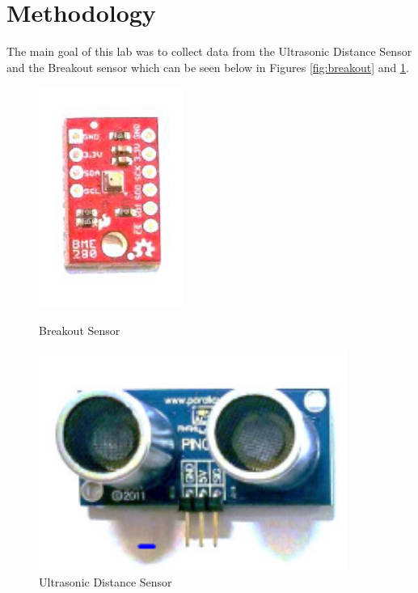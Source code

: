 \documentclass[11pt]{article}
\begin{document}
\section{Methodology}

The main goal of this lab was to collect data from the Ultrasonic Distance Sensor and the Breakout sensor which can be seen below in Figures \ref{fig:breakout} and \ref{fig:ultasound}.

\begin{figure}[ht]
    \centering
    \begin{minipage}{0.45\textwidth}
        \centering
        \includegraphics[width=0.42\textwidth]{pics/breakout_sensor.PNG}
        \caption{Breakout Sensor}
        \label{fig:breakout}
    \end{minipage}\hfill
    \begin{minipage}{0.45\textwidth}
        \centering
        \includegraphics[width=0.9\textwidth]{pics/ultrasound.PNG}
        \caption{Ultrasonic Distance Sensor}
        \label{fig:ultasound}
    \end{minipage}
\end{figure}
\end{document}

